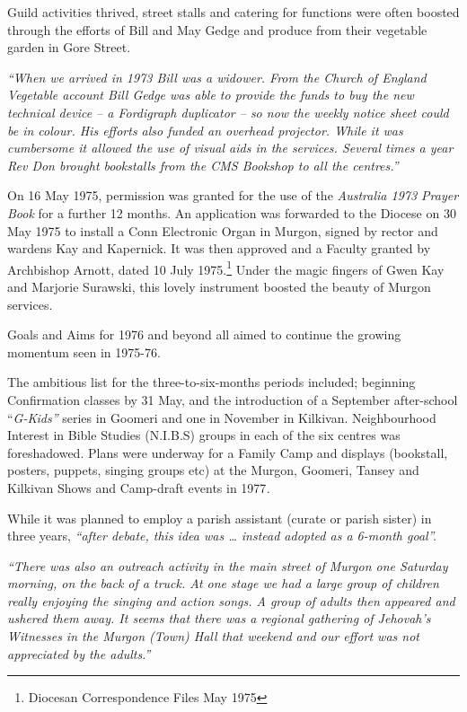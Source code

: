Guild activities thrived, street stalls and catering for functions were often boosted through the efforts of Bill and May Gedge and produce from their vegetable garden in Gore Street.

\emph{``When we arrived in 1973 Bill was a widower. From the Church of England Vegetable account Bill Gedge was able to provide the funds to buy the new technical device -- a Fordigraph duplicator -- so now the weekly notice sheet could be in colour. His efforts also funded an overhead projector. While it was cumbersome it allowed the use of visual aids in the services. Several times a year Rev Don brought bookstalls from the CMS Bookshop to all the centres.''}

On 16 May 1975, permission was granted for the use of the \emph{Australia 1973 Prayer Book} for a further 12 months. An application was forwarded to the Diocese on 30 May 1975 to install a Conn Electronic Organ in Murgon, signed by rector and wardens Kay and Kapernick. It was then approved and a Faculty granted by Archbishop Arnott, dated 10 July 1975.\footnote{Diocesan Correspondence Files May 1975} Under the magic fingers of Gwen Kay and Marjorie Surawski, this lovely instrument boosted the beauty of Murgon services.

Goals and Aims for 1976 and beyond all aimed to continue the growing momentum seen in 1975-76.

The ambitious list for the three-to-six-months periods included; beginning Confirmation classes by 31 May, and the introduction of a September after-school ``\emph{G-Kids''} series in Goomeri and one in November in Kilkivan. Neighbourhood Interest in Bible Studies (N.I.B.S) groups in each of the six centres was foreshadowed. Plans were underway for a Family Camp and displays (bookstall, posters, puppets, singing groups etc) at the Murgon, Goomeri, Tansey and Kilkivan Shows and Camp-draft events in 1977\emph{.}

While it was planned to employ a parish assistant (curate or parish sister) in three years, \emph{``after debate, this idea was \ldots{} instead adopted as a 6-month goal''.}

\emph{``There was also an outreach activity in the main street of Murgon one Saturday morning, on the back of a truck. At one stage we had a large group of children really enjoying the singing and action songs. A group of adults then appeared and ushered them away. It seems that there was a regional gathering of Jehovah's Witnesses in the Murgon (Town) Hall that weekend and our effort was not appreciated by the adults.''}

